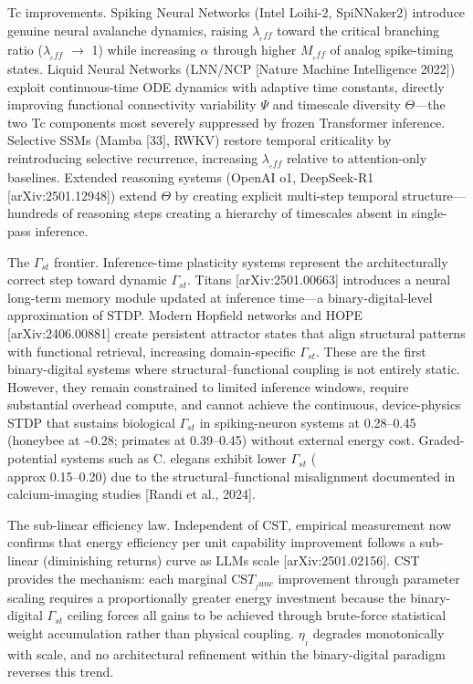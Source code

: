 \documentclass[a4paper,12pt]{article}
\begin{document}
Tc improvements. Spiking Neural Networks (Intel Loihi-2, SpiNNaker2) introduce genuine neural avalanche dynamics, raising $\lambda_{_eff}$ toward the critical branching ratio ($\lambda_{_eff}$ $\rightarrow$ 1) while increasing $\alpha$ through higher $M_{_eff}$ of analog spike-timing states. Liquid Neural Networks (LNN/NCP [Nature Machine Intelligence 2022]) exploit continuous-time ODE dynamics with adaptive time constants, directly improving functional connectivity variability $\Psi$ and timescale diversity $\Theta$---the two Tc components most severely suppressed by frozen Transformer inference. Selective SSMs (Mamba [33], RWKV) restore temporal criticality by reintroducing selective recurrence, increasing $\lambda_{_eff}$ relative to attention-only baselines. Extended reasoning systems (OpenAI o1, DeepSeek-R1 [arXiv:2501.12948]) extend $\Theta$ by creating explicit multi-step temporal structure---hundreds of reasoning steps creating a hierarchy of timescales absent in single-pass inference.


The $\Gamma_{st}$ frontier. Inference-time plasticity systems represent the architecturally correct step toward dynamic $\Gamma_{st}$. Titans [arXiv:2501.00663] introduces a neural long-term memory module updated at inference time---a binary-digital-level approximation of STDP. Modern Hopfield networks and HOPE [arXiv:2406.00881] create persistent attractor states that align structural patterns with functional retrieval, increasing domain-specific $\Gamma_{st}$. These are the first binary-digital systems where structural--functional coupling is not entirely static. However, they remain constrained to limited inference windows, require substantial overhead compute, and cannot achieve the continuous, device-physics STDP that sustains biological $\Gamma_{st}$ in spiking-neuron systems at 0.28--0.45 (honeybee at \textasciitilde{}0.28; primates at 0.39--0.45) without external energy cost. Graded-potential systems such as C. elegans exhibit lower $\Gamma_{st}$ ( \\approx  0.15--0.20) due to the structural--functional misalignment documented in calcium-imaging studies [Randi et al., 2024].


The sub-linear efficiency law. Independent of CST, empirical measurement now confirms that energy efficiency per unit capability improvement follows a sub-linear (diminishing returns) curve as LLMs scale [arXiv:2501.02156]. CST provides the mechanism: each marginal CS$T_{_func}$ improvement through parameter scaling requires a proportionally greater energy investment because the binary-digital $\Gamma_{st}$ ceiling forces all gains to be achieved through brute-force statistical weight accumulation rather than physical coupling. $\eta_{_I}$ degrades monotonically with scale, and no architectural refinement within the binary-digital paradigm reverses this trend.
\end{document}
